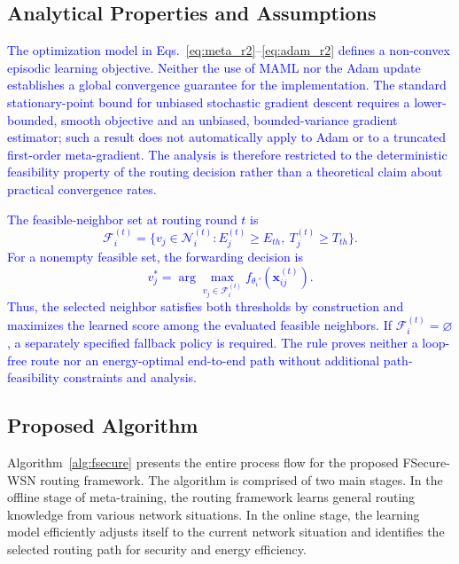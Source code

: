 \documentclass[pdflatex,sn-mathphys-num]{sn-jnl}
\newcommand{\Revised}[1]{\textcolor{blue}{#1}}
\begin{document}
\subsection{Analytical Properties and Assumptions}

\Revised{The optimization model in Eqs.~\eqref{eq:meta_r2}--\eqref{eq:adam_r2} defines a non-convex episodic learning objective. Neither the use of MAML nor the Adam update establishes a global convergence guarantee for the implementation. The standard stationary-point bound for unbiased stochastic gradient descent requires a lower-bounded, smooth objective and an unbiased, bounded-variance gradient estimator; such a result does not automatically apply to Adam or to a truncated first-order meta-gradient. The analysis is therefore restricted to the deterministic feasibility property of the routing decision rather than a theoretical claim about practical convergence rates.}

\Revised{The feasible-neighbor set at routing round $t$ is
\begin{equation}
 \mathcal F_i^{(t)}=\{v_j\in\mathcal N_i^{(t)}:E_j^{(t)}\geq E_{th},\ T_j^{(t)}\geq T_{th}\}.\label{eq:feasible_r2}
\end{equation}
For a nonempty feasible set, the forwarding decision is
\begin{equation}
 v_j^*=\arg\max_{v_j\in\mathcal F_i^{(t)}}f_{\theta_i'}(\mathbf x_{ij}^{(t)}).\label{eq:next_hop_r2}
\end{equation}
Thus, the selected neighbor satisfies both thresholds by construction and maximizes the learned score among the evaluated feasible neighbors. If $\mathcal F_i^{(t)}=\varnothing$, a separately specified fallback policy is required. The rule proves neither a loop-free route nor an energy-optimal end-to-end path without additional path-feasibility constraints and analysis.}

\subsection{Proposed Algorithm}

Algorithm~\ref{alg:fsecure} presents the entire process flow for the proposed FSecure-WSN routing framework. The algorithm is comprised of two main stages. In the offline stage of meta-training, the routing framework learns general routing knowledge from various network situations.
In the online stage, the learning model efficiently adjusts itself to the current network situation and identifies the selected routing path for security and energy efficiency.
\end{document}
